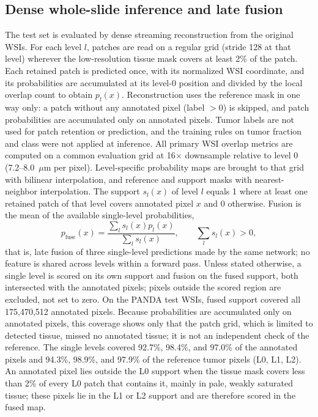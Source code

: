 \documentclass[10pt,letterpaper]{article}
\begin{document}
\subsection*{Dense whole-slide inference and late fusion}
The test set is evaluated by dense streaming reconstruction from the original WSIs. For each level $l$, patches are read on a regular grid (stride 128 at that level) wherever the low-resolution tissue mask covers at least 2\% of the patch. Each retained patch is predicted once, with its normalized WSI coordinate, and its probabilities are accumulated at its level-0 position and divided by the local overlap count to obtain $p_l(x)$. Reconstruction uses the reference mask in one way only: a patch without any annotated pixel (label $>0$) is skipped, and patch probabilities are accumulated only on annotated pixels. Tumor labels are not used for patch retention or prediction, and the training rules on tumor fraction and class were not applied at inference. All primary WSI overlap metrics are computed on a common evaluation grid at 16$\times$ downsample relative to level 0 (7.2--8.0~$\mu$m per pixel). Level-specific probability maps are brought to that grid with bilinear interpolation, and reference and support masks with nearest-neighbor interpolation. The support $s_l(x)$ of level $l$ equals 1 where at least one retained patch of that level covers annotated pixel $x$ and 0 otherwise. Fusion is the mean of the available single-level probabilities,
\begin{equation}
 p_{\mathrm{fuse}}(x)=\frac{\sum_l s_l(x)p_l(x)}{\sum_l s_l(x)}, \qquad \sum_l s_l(x)>0,
\end{equation}
that is, late fusion of three single-level predictions made by the same network; no feature is shared across levels within a forward pass. Unless stated otherwise, a single level is scored on its own support and fusion on the fused support, both intersected with the annotated pixels; pixels outside the scored region are excluded, not set to zero. On the PANDA test WSIs, fused support covered all 175,470,512 annotated pixels. Because probabilities are accumulated only on annotated pixels, this coverage shows only that the patch grid, which is limited to detected tissue, missed no annotated tissue; it is not an independent check of the reference. The single levels covered 92.7\%, 98.4\%, and 97.0\% of the annotated pixels and 94.3\%, 98.9\%, and 97.9\% of the reference tumor pixels (L0, L1, L2). An annotated pixel lies outside the L0 support when the tissue mask covers less than 2\% of every L0 patch that contains it, mainly in pale, weakly saturated tissue; these pixels lie in the L1 or L2 support and are therefore scored in the fused map.
\end{document}
